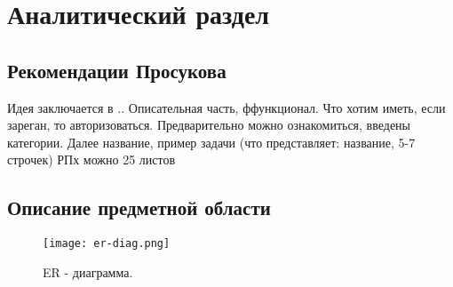 \chapter{Аналитический раздел}

\section{Рекомендации Просукова}
Идея заключается в ..
Описательная часть, ффункционал. Что хотим иметь, если зареган, то авторизоваться.
Предварительно можно ознакомиться, введены категории.  Далее название, пример задачи (что представляет: название, 5-7 строчек)
РПх можно 25 листов

\section{Описание предметной области}


\begin{figure}[h]
  \centering
  \texttt{[image: er-diag.png]}
  \caption{ER - диаграмма.}
\end{figure}



% 
% 
